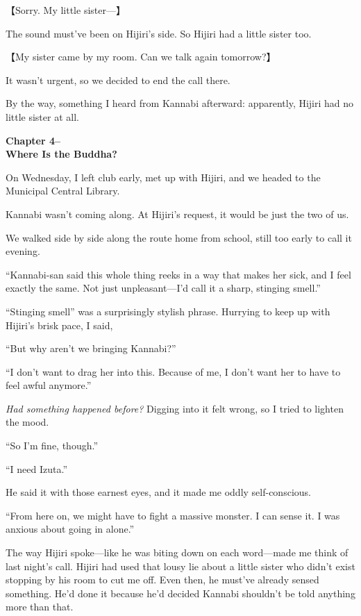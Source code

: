 \documentclass[
    a4paper,
    12pt,
    twoside,
    openany,
    UTF8,
    fontset=windows
]{ctexbook}
\begin{document}
【Sorry. My little sister---】

The sound must've been on Hijiri's side. So Hijiri had a little sister too.

【My sister came by my room. Can we talk again tomorrow?】

It wasn't urgent, so we decided to end the call there.

By the way, something I heard from Kannabi afterward: apparently, Hijiri had no little sister at all.

\clearpage
\thispagestyle{plain}
\begin{center}
    \large\bfseries
    Chapter 4–\\
    Where Is the Buddha?
\end{center}
\label{sec:ch4m}
\vspace{1cm}

On Wednesday, I left club early, met up with Hijiri, and we headed to the Municipal Central Library.

Kannabi wasn't coming along. At Hijiri's request, it would be just the two of us.

We walked side by side along the route home from school, still too early to call it evening.

``Kannabi-san said this whole thing reeks in a way that makes her sick, and I feel exactly the same. Not just unpleasant---I'd call it a sharp, stinging smell.''

``Stinging smell'' was a surprisingly stylish phrase. Hurrying to keep up with Hijiri's brisk pace, I said,

``But why aren't we bringing Kannabi?''

``I don't want to drag her into this. Because of me, I don't want her to have to feel awful anymore.''

\textit{Had something happened before?} Digging into it felt wrong, so I tried to lighten the mood.

``So I'm fine, though.''

``I need Izuta.''

He said it with those earnest eyes, and it made me oddly self-conscious.

``From here on, we might have to fight a massive monster. I can sense it. I was anxious about going in alone.''

The way Hijiri spoke---like he was biting down on each word---made me think of last night's call. Hijiri had used that lousy lie about a little sister who didn't exist stopping by his room to cut me off. Even then, he must've already sensed something. He'd done it because he'd decided Kannabi shouldn't be told anything more than that.
\end{document}
